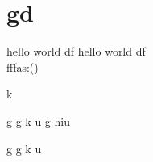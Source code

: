 \documentclass{article}
\begin{document}
\section{gd}
	hello world df \textbf{\gitRel}
	hello world df \textbf{\gitRel}\\
	fffas:\gitRoff(\gitCommitterDate)\\
	\newpage
	\begin{changelog}[author=Michele]
		\begin{version}[version=1.20]
			\added
			\item k
		\end{version}
		\begin{version}[version=\gitReln]
		\added
		\item  g g k u g  hiu 
	\end{version}
		\begin{version}[version=\gitReln]
	\added
	\item  g g k u 
\end{version}
	\end{changelog}
\end{document}
